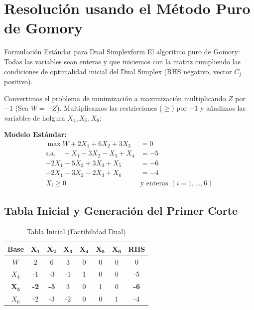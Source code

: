 \documentclass[10pt,a4paper]{article}
\begin{document}
\newpage


\section{Resolución usando el Método Puro de Gomory}

\begin{ejercicio}{Formulación Estándar para Dual Simplex}{form}
El algoritmo puro de Gomory: Todas las variables sean enteras y que iniciemos con la matriz cumpliendo 
las condiciones de optimalidad inicial del Dual Simplex 
(RHS negativo, vector $C_j$ positivo).

Convertimos el problema de minimización a maximización multiplicando $Z$ por $-1$ (Sea $W = -Z$). Multiplicamos las restricciones ($\geq$) por $-1$ y añadimos las variables de holgura $X_4, X_5, X_6$:

\textbf{Modelo Estándar:}
\begin{align*}
    \max W + 2X_1 + 6X_2 + 3X_3 &= 0 \\
    \text{s.a.} \quad -X_1 - 3X_2 - X_3 + X_4 &= -5 \\
    -2X_1 - 5X_2 + 3X_3 + X_5 &= -6 \\
    -2X_1 - 3X_2 - 2X_3 + X_6 &= -4 \\
    X_i \geq 0 \quad &\text{y enteras } (i=1,\dots,6)
\end{align*}
\end{ejercicio}

\subsection{Tabla Inicial y Generación del Primer Corte}

\begin{table}[H]
    \centering
    \begin{tabular}{c c c c c c c | c}
    \toprule
    \textbf{Base} & $\mathbf{X_1}$ & $\mathbf{X_2}$ & $\mathbf{X_3}$ & $\mathbf{X_4}$ & $\mathbf{X_5}$ & $\mathbf{X_6}$ & \textbf{RHS} \\
    \midrule
    $W$   & 2 & 6 & 3 & 0 & 0 & 0 & 0 \\
    $X_4$ & -1 & -3 & -1 & 1 & 0 & 0 & -5 \\
    $\mathbf{X_5}$ & \textbf{-2} & \textbf{-5} & 3 & 0 & 1 & 0 & \textbf{-6} \\
    $X_6$ & -2 & -3 & -2 & 0 & 0 & 1 & -4 \\
    \bottomrule
    \end{tabular}
    \caption{Tabla Inicial (Factibilidad Dual)}
\end{table}
\end{document}
